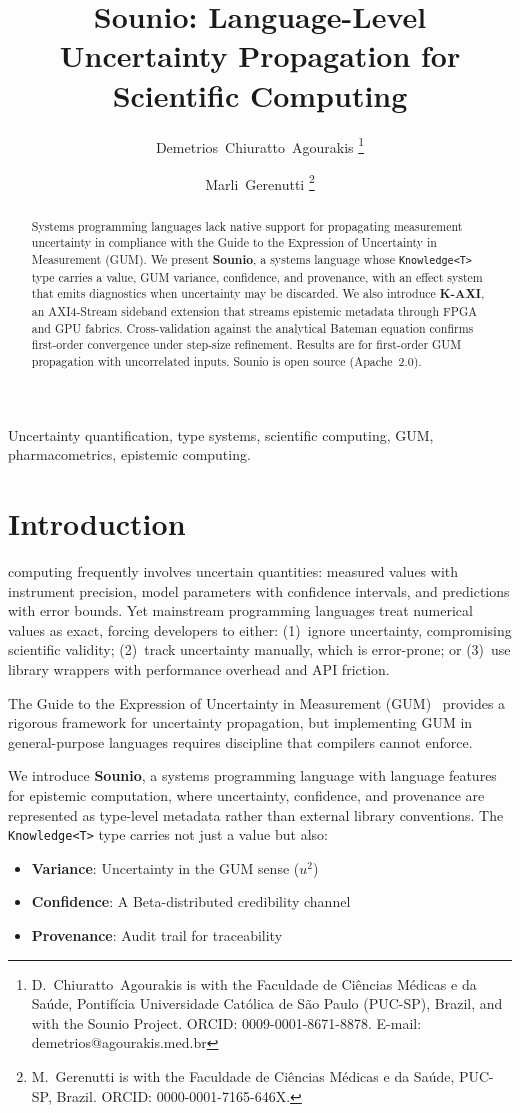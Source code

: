 \documentclass[journal]{IEEEtran}
\title{Sounio: Language-Level Uncertainty Propagation for Scientific Computing}
\author{Demetrios~Chiuratto~Agourakis%
  \thanks{D.~Chiuratto~Agourakis is with the Faculdade de Ci\^{e}ncias
    M\'{e}dicas e da Sa\'{u}de, Pontif\'{i}cia Universidade Cat\'{o}lica
    de S\~{a}o Paulo (PUC-SP), Brazil, and with the Sounio Project.
    ORCID: 0009-0001-8671-8878.
    E-mail: demetrios@agourakis.med.br}%
  \and Marli~Gerenutti%
  \thanks{M.~Gerenutti is with the Faculdade de Ci\^{e}ncias
    M\'{e}dicas e da Sa\'{u}de, PUC-SP, Brazil.
    ORCID: 0000-0001-7165-646X.}%
}
\begin{document}
\maketitle

\begin{abstract}
Systems programming languages lack native support for propagating
measurement uncertainty in compliance with the Guide to the Expression
of Uncertainty in Measurement (GUM). We present \textbf{Sounio}, a
systems language whose \texttt{Knowledge<T>} type carries a value, GUM
variance, confidence, and provenance, with an effect system that emits
diagnostics when uncertainty may be discarded. We also introduce
\textbf{K-AXI}, an AXI4-Stream sideband extension that streams epistemic
metadata through FPGA and GPU fabrics. Cross-validation against the
analytical Bateman equation confirms first-order convergence under
step-size refinement. Results are for first-order GUM propagation with
uncorrelated inputs. Sounio is open source (Apache~2.0).
\end{abstract}

\begin{IEEEkeywords}
Uncertainty quantification, type systems, scientific computing, GUM,
pharmacometrics, epistemic computing.
\end{IEEEkeywords}

\section{Introduction}
\label{sec:intro}

 computing frequently involves uncertain
quantities: measured values with instrument precision, model parameters
with confidence intervals, and predictions with error bounds. Yet
mainstream programming languages treat numerical values as exact, forcing
developers to either: (1)~ignore uncertainty, compromising scientific
validity; (2)~track uncertainty manually, which is error-prone; or
(3)~use library wrappers with performance overhead and API friction.

The Guide to the Expression of Uncertainty in Measurement
(GUM)~\cite{jcgm2008gum} provides a rigorous framework for uncertainty
propagation, but implementing GUM in general-purpose languages requires
discipline that compilers cannot enforce.

We introduce \textbf{Sounio}, a systems programming language with language
features for epistemic computation, where uncertainty, confidence, and
provenance are represented as type-level metadata rather than external
library conventions. The \texttt{Knowledge<T>} type
carries not just a value but also:
\begin{itemize}
  \item \textbf{Variance}: Uncertainty in the GUM sense ($u^2$)
  \item \textbf{Confidence}: A Beta-distributed credibility channel
  \item \textbf{Provenance}: Audit trail for traceability
\end{itemize}
\end{document}
